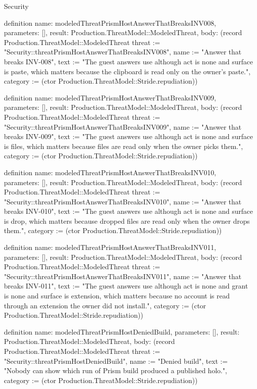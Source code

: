 \begin{lexlean}{Security}
\begin{semanticmodule}
definition{
  name: modeledThreatPrismHostAnswerThatBreaksINV008,
  parameters: [],
  result: Production.ThreatModel::ModeledThreat,
  body: (record Production.ThreatModel::ModeledThreat {threat := "Security::threatPrismHostAnswerThatBreaksINV008", name := "Answer that breaks INV-008", text := "The guest answers use although act is none and surface is paste, which matters because the clipboard is read only on the owner's paste.", category := (ctor Production.ThreatModel::Stride.repudiation)})
}

definition{
  name: modeledThreatPrismHostAnswerThatBreaksINV009,
  parameters: [],
  result: Production.ThreatModel::ModeledThreat,
  body: (record Production.ThreatModel::ModeledThreat {threat := "Security::threatPrismHostAnswerThatBreaksINV009", name := "Answer that breaks INV-009", text := "The guest answers use although act is none and surface is files, which matters because files are read only when the owner picks them.", category := (ctor Production.ThreatModel::Stride.repudiation)})
}

definition{
  name: modeledThreatPrismHostAnswerThatBreaksINV010,
  parameters: [],
  result: Production.ThreatModel::ModeledThreat,
  body: (record Production.ThreatModel::ModeledThreat {threat := "Security::threatPrismHostAnswerThatBreaksINV010", name := "Answer that breaks INV-010", text := "The guest answers use although act is none and surface is drop, which matters because dropped files are read only when the owner drops them.", category := (ctor Production.ThreatModel::Stride.repudiation)})
}

definition{
  name: modeledThreatPrismHostAnswerThatBreaksINV011,
  parameters: [],
  result: Production.ThreatModel::ModeledThreat,
  body: (record Production.ThreatModel::ModeledThreat {threat := "Security::threatPrismHostAnswerThatBreaksINV011", name := "Answer that breaks INV-011", text := "The guest answers use although act is none and grant is none and surface is extension, which matters because no account is read through an extension the owner did not install.", category := (ctor Production.ThreatModel::Stride.repudiation)})
}

definition{
  name: modeledThreatPrismHostDeniedBuild,
  parameters: [],
  result: Production.ThreatModel::ModeledThreat,
  body: (record Production.ThreatModel::ModeledThreat {threat := "Security::threatPrismHostDeniedBuild", name := "Denied build", text := "Nobody can show which run of Prism build produced a published holo.", category := (ctor Production.ThreatModel::Stride.repudiation)})
}


\end{semanticmodule}
\end{lexlean}
